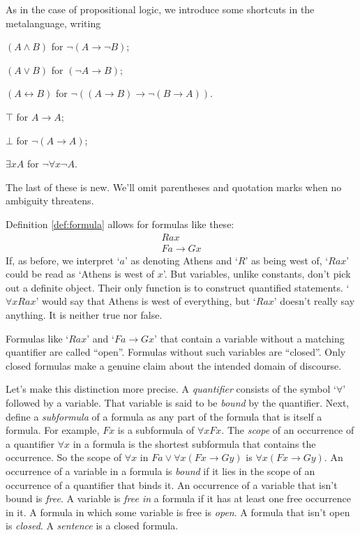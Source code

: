 As in the case of propositional logic,
we introduce some shortcuts in the metalanguage, writing

\begin{itemize*}
\item $(A \land B)$ for $\neg(A \to \neg B)$;
\item $(A \lor B)$ for $(\neg A \to B)$;
\item $(A \leftrightarrow B)$ for $\neg ((A \to B) \to \neg(B \to A))$.
\item $\top$ for $A \to A$;
\item $\bot$ for $\neg(A \to A)$;
\item $\exists x A$ for $\neg \forall x \neg A$.
\end{itemize*}
\noindent%
The last of these is new.
We'll omit parentheses and quotation marks when no ambiguity threatens.

Definition \ref{def:formula} allows for formulas like these:
%
\begin{gather*}
  Rax\\
  Fa \to Gx
\end{gather*}
%
If, as before, we interpret
`$a$' as denoting Athens and `$R$' as being west of,
`$Rax$' could be read as `Athens is west of $x$'.
But variables, unlike constants, don't pick out a definite object.
Their only function is to construct quantified statements.
`$\forall x Rax$' would say that Athens is west of everything,
but `$Rax$' doesn't really say anything.
It is neither true nor false.

Formulas like `$Rax$' and `$Fa \to Gx$' that contain a variable
without a matching quantifier are called ``open''.
Formulas without such variables are ``closed''.
Only closed formulas make a genuine claim about
the intended domain of discourse.

Let's make this distinction more precise.
A \emph{quantifier} consists of the symbol `$\forall$' followed by a variable.
That variable is said to be \emph{bound} by the quantifier.
Next,
define a \emph{subformula} of a formula as any part of the formula that is itself a formula.
For example,
$Fx$ is a subformula of $\forall x Fx$.
The \emph{scope} of an occurrence of a quantifier $\forall x$ in a formula is
the shortest subformula that contains the occurrence.
So the scope of $\forall x$ in $Fa \lor \forall x (Fx \to Gy)$ is
$\forall x(Fx \to Gy)$.
An occurrence of a variable in a formula is \emph{bound}
if it lies in the scope of an occurrence of a quantifier that binds it.
An occurrence of a variable that isn't bound is \emph{free}.
A variable is \emph{free in} a formula if it has at least one free occurrence in it.
A formula in which some variable is free is \emph{open}.
A formula that isn't open is \emph{closed}.
A \emph{sentence} is a closed formula.

